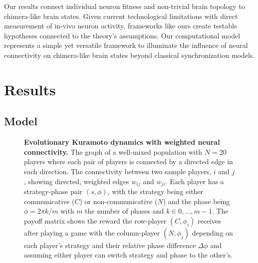\documentclass[pdflatex,lineno,referee,sn-nature]{sn-jnl}
\begin{document}
Our results connect individual neuron fitness and non-trivial brain topology
to chimera-like brain states.
Given current technological limitations with direct measurement of in-vivo neuron activity,
frameworks like ours create testable hypotheses connected to the theory's assumptions.
Our computational model represents a simple yet versatile framework
to illuminate the influence of neural connectivity on chimera-like brain states
beyond classical synchronization models.

\section{Results}\label{sec:results}

\subsection{Model}
\begin{figure*}
  \centering
  \begin{nomemoize} %
    \begin{subcaptiongroup}
        {\label{fig:payoff_matrix}\captiontext*{}}{%
        {\label{fig:player_interactions}\captiontext*{}}{%
        {\label{fig:graph_well-mixed}\captiontext*{}}{%
      {}%
    }}}
    \end{subcaptiongroup}
  \end{nomemoize}
  \caption{
    \textbf{
      Evolutionary Kuramoto dynamics with weighted neural connectivity.
    }
    The graph of a well-mixed population with $N=20$ players
    where each pair of players is connected by a directed edge in each direction.
    The connectivity between two sample players, $i$ and $j$,
    showing directed, weighted edges $w_{ij}$ and $w_{ji}$.
    Each player has a strategy-phase pair $(s, \phi)$,
    with the strategy being either communicative ($C$) or non-communicative ($N$)
    and the phase being $\phi = 2\pi k/m$ with $m$ the number of phases
    and $k \in 0,\ldots,m-1$.
    The payoff matrix shows the reward the row-player $(C, \phi_i)$
    receives after playing a game with the column-player $(N, \phi_j)$
    depending on each player's strategy and
    their relative phase difference $\Delta \phi$
    and assuming either player can switch strategy and phase to the other's.
  }\label{fig:connectivity}
\end{figure*}
\end{document}
